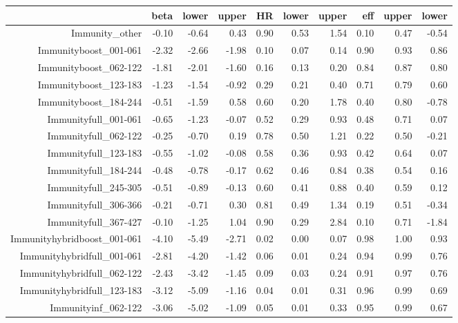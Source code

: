 \begin{table}[ht]
\centering
\begin{tabular}{rrrrrrrrrr}
  \hline
 & beta & lower & upper & HR & lower & upper & eff & upper & lower \\ 
  \hline
Immunity\_other & -0.10 & -0.64 & 0.43 & 0.90 & 0.53 & 1.54 & 0.10 & 0.47 & -0.54 \\ 
  Immunityboost\_001-061 & -2.32 & -2.66 & -1.98 & 0.10 & 0.07 & 0.14 & 0.90 & 0.93 & 0.86 \\ 
  Immunityboost\_062-122 & -1.81 & -2.01 & -1.60 & 0.16 & 0.13 & 0.20 & 0.84 & 0.87 & 0.80 \\ 
  Immunityboost\_123-183 & -1.23 & -1.54 & -0.92 & 0.29 & 0.21 & 0.40 & 0.71 & 0.79 & 0.60 \\ 
  Immunityboost\_184-244 & -0.51 & -1.59 & 0.58 & 0.60 & 0.20 & 1.78 & 0.40 & 0.80 & -0.78 \\ 
  Immunityfull\_001-061 & -0.65 & -1.23 & -0.07 & 0.52 & 0.29 & 0.93 & 0.48 & 0.71 & 0.07 \\ 
  Immunityfull\_062-122 & -0.25 & -0.70 & 0.19 & 0.78 & 0.50 & 1.21 & 0.22 & 0.50 & -0.21 \\ 
  Immunityfull\_123-183 & -0.55 & -1.02 & -0.08 & 0.58 & 0.36 & 0.93 & 0.42 & 0.64 & 0.07 \\ 
  Immunityfull\_184-244 & -0.48 & -0.78 & -0.17 & 0.62 & 0.46 & 0.84 & 0.38 & 0.54 & 0.16 \\ 
  Immunityfull\_245-305 & -0.51 & -0.89 & -0.13 & 0.60 & 0.41 & 0.88 & 0.40 & 0.59 & 0.12 \\ 
  Immunityfull\_306-366 & -0.21 & -0.71 & 0.30 & 0.81 & 0.49 & 1.34 & 0.19 & 0.51 & -0.34 \\ 
  Immunityfull\_367-427 & -0.10 & -1.25 & 1.04 & 0.90 & 0.29 & 2.84 & 0.10 & 0.71 & -1.84 \\ 
  Immunityhybridboost\_001-061 & -4.10 & -5.49 & -2.71 & 0.02 & 0.00 & 0.07 & 0.98 & 1.00 & 0.93 \\ 
  Immunityhybridfull\_001-061 & -2.81 & -4.20 & -1.42 & 0.06 & 0.01 & 0.24 & 0.94 & 0.99 & 0.76 \\ 
  Immunityhybridfull\_062-122 & -2.43 & -3.42 & -1.45 & 0.09 & 0.03 & 0.24 & 0.91 & 0.97 & 0.76 \\ 
  Immunityhybridfull\_123-183 & -3.12 & -5.09 & -1.16 & 0.04 & 0.01 & 0.31 & 0.96 & 0.99 & 0.69 \\ 
  Immunityinf\_062-122 & -3.06 & -5.02 & -1.09 & 0.05 & 0.01 & 0.33 & 0.95 & 0.99 & 0.67 \\ 

\end{tabular}
\end{table}
